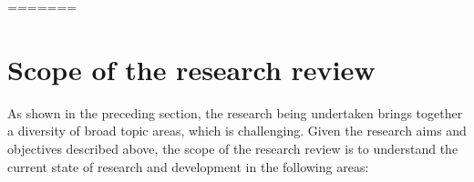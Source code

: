 \documentclass[11pt, a4paper, oneside]{report} %
\begin{document}








=======
\section{Scope of the research review}

As shown in the preceding section, the research being undertaken brings together
a diversity of broad topic areas, which is challenging. Given the research aims
and objectives described above, the scope of the research review is to
understand the current state of research and development in the following areas:
\end{document}
